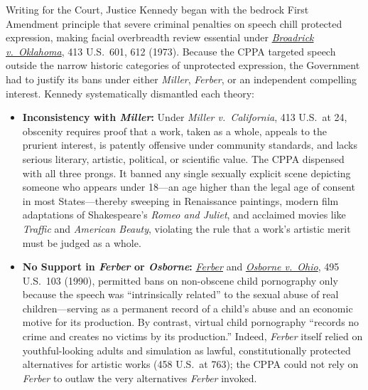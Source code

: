 \documentclass[12pt]{article}
\begin{document}
Writing for the Court, Justice Kennedy began with the bedrock First Amendment principle that severe criminal penalties on speech chill protected expression, making facial overbreadth review essential under \href{https://supreme.justia.com/cases/federal/us/413/601/}{\textit{Broadrick v.\ Oklahoma}}, 413 U.S.\ 601, 612 (1973). Because the CPPA targeted speech outside the narrow historic categories of unprotected expression, the Government had to justify its bans under either \textit{Miller}, \textit{Ferber}, or an independent compelling interest. Kennedy systematically dismantled each theory:

\begin{itemize}
\item \textbf{Inconsistency with \textit{Miller}:} Under \textit{Miller v.\ California}, 413 U.S.\ at 24, obscenity requires proof that a work, taken as a whole, appeals to the prurient interest, is patently offensive under community standards, and lacks serious literary, artistic, political, or scientific value. The CPPA dispensed with all three prongs. It banned any single sexually explicit scene depicting someone who appears under 18---an age higher than the legal age of consent in most States---thereby sweeping in Renaissance paintings, modern film adaptations of Shakespeare's \textit{Romeo and Juliet}, and acclaimed movies like \textit{Traffic} and \textit{American Beauty}, violating the rule that a work's artistic merit must be judged as a whole.
\item \textbf{No Support in \textit{Ferber} or \textit{Osborne}:} \href{https://supreme.justia.com/cases/federal/us/458/747/}{\textit{Ferber}} and \href{https://supreme.justia.com/cases/federal/us/495/103/}{\textit{Osborne v.\ Ohio}}, 495 U.S.\ 103 (1990), permitted bans on non-obscene child pornography only because the speech was ``intrinsically related'' to the sexual abuse of real children---serving as a permanent record of a child's abuse and an economic motive for its production. By contrast, virtual child pornography ``records no crime and creates no victims by its production.'' Indeed, \textit{Ferber} itself relied on youthful-looking adults and simulation as lawful, constitutionally protected alternatives for artistic works (458 U.S.\ at 763); the CPPA could not rely on \textit{Ferber} to outlaw the very alternatives \textit{Ferber} invoked.

\end{itemize}
\end{document}
